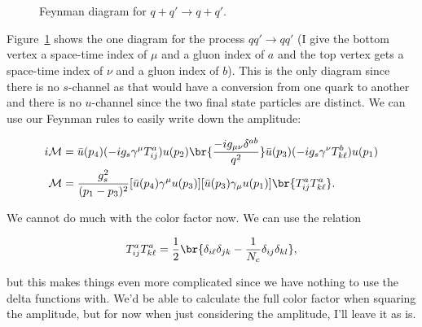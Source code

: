 \section{}

\begin{figure}[ht]
  \centering

  
  \caption{Feynman diagram for $q+q' \rightarrow q+q'$.}
  \label{fig:1}
\end{figure}


Figure~\ref{fig:1} shows the one diagram for the process $qq' \rightarrow qq'$ (I give the bottom vertex a space-time index of $\mu$ and a gluon index of $a$ and the top vertex gets a space-time index of $\nu$ and a gluon index of $b$). This is the only diagram since there is no $s$-channel as that would have a conversion from one quark to another and there is no $u$-channel since the two final state particles are distinct. We can use our Feynman rules to easily write down the amplitude:

\begin{align}
  i\mathcal{M} &= \bar{u}(p_4)(-ig_s \gamma^\mu T^a_{ij})u(p_2) \br{\frac{-ig_{\mu\nu}\delta^{ab}}{q^2}} \bar{u}(p_3)(-ig_s \gamma^\nu T^b_{k\ell})u(p_1) \\
  \mathcal{M} &= \frac{g_s^2}{(p_1 - p_3)^2} [\bar{u}(p_4) \gamma^\mu u(p_3)] [\bar{u}(p_3) \gamma_\mu u(p_1)] \br{T^a_{ij}T^a_{k\ell}}.
\end{align}

We cannot do much with the color factor now. We can use the relation

\begin{equation}
  T^a_{ij}T^a_{k\ell} = \frac{1}{2}\br{\delta_{i\ell}\delta_{jk} - \frac{1}{N_c}\delta_{ij}\delta_{kl}},
\end{equation}

but this makes things even more complicated since we have nothing to use the delta functions with. We'd be able to calculate the full color factor when squaring the amplitude, but for now when just considering the amplitude, I'll leave it as is.


